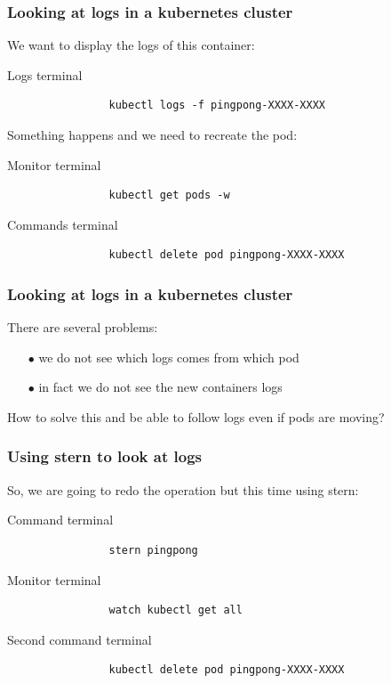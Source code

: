 	\begin{frame}[fragile]
		\frametitle{Looking at logs in a kubernetes cluster}
	
		We want to display the logs of this container:
		\begin{block}{Logs terminal}
			\begin{verbatim}
				kubectl logs -f pingpong-XXXX-XXXX
			\end{verbatim}
		\end{block}
		
		Something happens and we need to recreate the pod:
		\begin{block}{Monitor terminal}
			\begin{verbatim}
				kubectl get pods -w
			\end{verbatim}
		\end{block}
		\begin{block}{Commands terminal}
			\begin{verbatim}
				kubectl delete pod pingpong-XXXX-XXXX
			\end{verbatim}
		\end{block}
	\end{frame}
	
	
	\begin{frame}[fragile]
		\frametitle{Looking at logs in a kubernetes cluster}
	
		There are several problems:
		\begin{itemize}
			\item[$\bullet$] we do not see which logs comes from which pod
			\item[$\bullet$] in fact we do not see the new containers logs
		\end{itemize}

		\medskip		
		
		How to solve this and be able to follow logs even if pods are moving?
	\end{frame}

	\begin{frame}[fragile]
		\frametitle{Using stern to look at logs}

		So, we are going to redo the operation but this time using stern:
		\begin{block}{Command terminal}
			\begin{verbatim}
				stern pingpong
			\end{verbatim}
		\end{block}
				\begin{block}{Monitor terminal}
			\begin{verbatim}
				watch kubectl get all
			\end{verbatim}
		\end{block}
		\begin{block}{Second command terminal}
			\begin{verbatim}
				kubectl delete pod pingpong-XXXX-XXXX
			\end{verbatim}
		\end{block}
	\end{frame}
	
